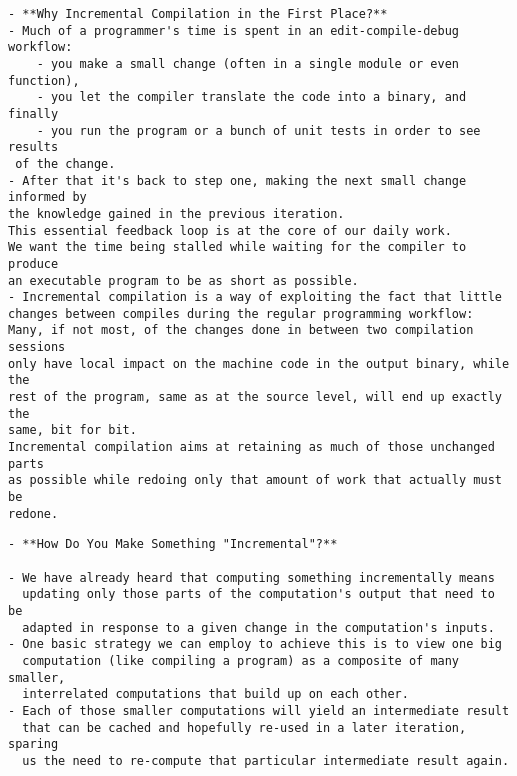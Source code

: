 \documentclass[12pt, a4paper]{report}
\begin{document}
\begin{verbatim}
- **Why Incremental Compilation in the First Place?**
- Much of a programmer's time is spent in an edit-compile-debug workflow:
	- you make a small change (often in a single module or even function),
	- you let the compiler translate the code into a binary, and finally
	- you run the program or a bunch of unit tests in order to see results
 of the change.
- After that it's back to step one, making the next small change informed by
the knowledge gained in the previous iteration.
This essential feedback loop is at the core of our daily work.
We want the time being stalled while waiting for the compiler to produce
an executable program to be as short as possible.
- Incremental compilation is a way of exploiting the fact that little
changes between compiles during the regular programming workflow:
Many, if not most, of the changes done in between two compilation sessions
only have local impact on the machine code in the output binary, while the
rest of the program, same as at the source level, will end up exactly the
same, bit for bit.
Incremental compilation aims at retaining as much of those unchanged parts
as possible while redoing only that amount of work that actually must be
redone.
\end{verbatim}

\begin{verbatim}
- **How Do You Make Something "Incremental"?**

- We have already heard that computing something incrementally means
  updating only those parts of the computation's output that need to be
  adapted in response to a given change in the computation's inputs.
- One basic strategy we can employ to achieve this is to view one big
  computation (like compiling a program) as a composite of many smaller,
  interrelated computations that build up on each other.
- Each of those smaller computations will yield an intermediate result
  that can be cached and hopefully re-used in a later iteration, sparing
  us the need to re-compute that particular intermediate result again.
\end{verbatim}
\end{document}
